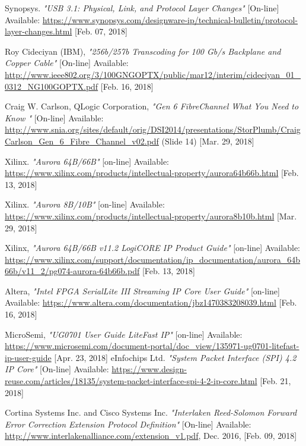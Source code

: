 \begin{thebibliography}{9}
  Synopsys.
  \textit{"USB 3.1: Physical, Link, and Protocol Layer Changes"}
  [On-line] Available: \url{https://www.synopsys.com/designware-ip/technical-bulletin/protocol-layer-changes.html} [Feb. 07, 2018]

	Roy Cideciyan (IBM),
	\textit{"256b/257b Transcoding for 100 Gb/s Backplane and Copper Cable"}
	[On-line] Available:
	\url{http://www.ieee802.org/3/100GNGOPTX/public/mar12/interim/cideciyan_01_0312_NG100GOPTX.pdf} [Feb. 16, 2018]
	
	Craig W. Carlson, QLogic Corporation,
	\textit{"Gen 6 FibreChannel	What You Need to Know "}	
	[On-line] Available:
	\url{http://www.snia.org/sites/default/orig/DSI2014/presentations/StorPlumb/CraigCarlson_Gen_6_Fibre_Channel_v02.pdf} (Slide 14) [Mar. 29, 2018]

	Xilinx.
	\textit{"Aurora 64B/66B"}
	[on-line] Available:
	\url{https://www.xilinx.com/products/intellectual-property/aurora64b66b.html} [Feb. 13, 2018]

	Xilinx.
	\textit{"Aurora 8B/10B"}
	[on-line] Available:
	\url{https://www.xilinx.com/products/intellectual-property/aurora8b10b.html} [Mar. 29, 2018]

	Xilinx,
	\textit{"Aurora 64B/66B v11.2 LogiCORE IP Product Guide"}
	[on-line] Available:
	\url{https://www.xilinx.com/support/documentation/ip_documentation/aurora_64b66b/v11_2/pg074-aurora-64b66b.pdf} [Feb. 13, 2018]

	Altera,
	\textit{"Intel FPGA SerialLite III Streaming IP Core User Guide"}
	[on-line] Available:
	\url{https://www.altera.com/documentation/jbz1470383208039.html} [Feb. 16, 2018]

	MicroSemi,
	\textit{"UG0701 User Guide LiteFast IP"}
	[on-line] Available:
	\url{https://www.microsemi.com/document-portal/doc_view/135971-ug0701-litefast-ip-user-guide} [Apr. 23, 2018]
	eInfochips Ltd.
	\textit{"System Packet Interface (SPI) 4.2 IP Core"}
	[On-line] Available:
	\url{https://www.design-reuse.com/articles/18135/system-packet-interface-spi-4-2-ip-core.html} [Feb. 21, 2018]
	

	
	Cortina Systems Inc. and Cisco Systems Inc.
	\textit{"Interlaken	Reed-Solomon Forward Error Correction Extension Protocol Definition"}
	[On-line] Available:
	\url{http://www.interlakenalliance.com/extension_v1.pdf}, Dec. 2016, [Feb. 09, 2018]
	

\end{thebibliography}
